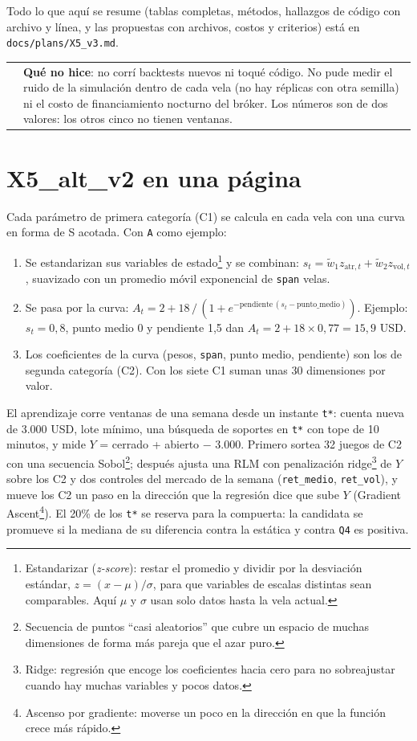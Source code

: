 \documentclass[11pt,a4paper]{article}
\makeatletter
\newcommand{\code}[1]{\texttt{\small #1}}
\newenvironment{caja}[1]{%
  \par\medskip\noindent
  \begin{tabular}{@{}p{0.4em}@{\hspace{8pt}}p{\dimexpr\linewidth-2em\relax}@{}}
  \textcolor{#1}{\rule{3pt}{1.1em}} &
}{\end{tabular}\par\medskip}
\newenvironment{nota}{\begin{caja}{cnaranja}}{\end{caja}}
\makeatother
\begin{document}
Todo lo que aquí se resume (tablas completas, métodos, hallazgos de código con archivo y línea, y las
propuestas con archivos, costos y criterios) está en \code{docs/plans/X5\_v3.md}.

\begin{nota}
\textbf{Qué no hice}: no corrí backtests nuevos ni toqué código. No pude medir el ruido de la simulación
dentro de cada vela (no hay réplicas con otra semilla) ni el costo de financiamiento nocturno del bróker.
Los números son de dos valores: los otros cinco no tienen ventanas.
\end{nota}

\section{X5\_alt\_v2 en una página}

Cada parámetro de primera categoría (C1) se calcula en cada vela con una curva en forma de S acotada. Con
\code{A} como ejemplo:
\begin{enumerate}[leftmargin=1.4em]
  \item Se estandarizan sus variables de estado\footnote{Estandarizar (\emph{z-score}): restar el promedio y
        dividir por la desviación estándar, $z=(x-\mu)/\sigma$, para que variables de escalas distintas
        sean comparables. Aquí $\mu$ y $\sigma$ usan solo datos hasta la vela actual.} y se combinan:
        $s_t = \tilde w_1 z_{\text{atr},t} + \tilde w_2 z_{\text{vol},t}$, suavizado con un promedio móvil
        exponencial de \code{span} velas.
  \item Se pasa por la curva: $A_t = 2 + 18\,/\,(1+e^{-\text{pendiente}\,(s_t-\text{punto\_medio})})$.
        Ejemplo: $s_t=0{,}8$, punto medio 0 y pendiente 1,5 dan $A_t = 2 + 18 \times 0{,}77 = 15{,}9$ USD.
  \item Los coeficientes de la curva (pesos, \code{span}, punto medio, pendiente) son los de segunda
        categoría (C2). Con los siete C1 suman unas 30 dimensiones por valor.
\end{enumerate}

El aprendizaje corre ventanas de una semana desde un instante \code{t*}: cuenta nueva de 3.000 USD, lote
mínimo, una búsqueda de soportes en \code{t*} con tope de 10 minutos, y mide $Y$ = cerrado + abierto
$-$ 3.000. Primero sortea 32 juegos de C2 con una secuencia Sobol\footnote{Secuencia de puntos ``casi
aleatorios'' que cubre un espacio de muchas dimensiones de forma más pareja que el azar puro.}; después
ajusta una RLM con penalización ridge\footnote{Ridge: regresión que encoge los coeficientes hacia cero para
no sobreajustar cuando hay muchas variables y pocos datos.} de $Y$ sobre los C2 y dos controles del
mercado de la semana (\code{ret\_medio}, \code{ret\_vol}), y mueve los C2 un paso en la dirección que la
regresión dice que sube $Y$ (Gradient Ascent\footnote{Ascenso por gradiente: moverse un poco en la
dirección en que la función crece más rápido.}). El 20\% de los \code{t*} se reserva para la compuerta: la
candidata se promueve si la mediana de su diferencia contra la estática y contra \code{Q4} es positiva.
\end{document}
